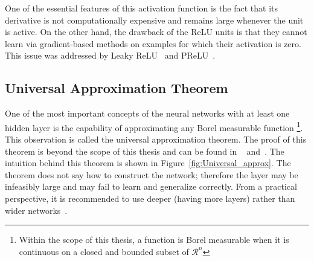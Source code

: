 One of the essential features of this activation function is the fact that its derivative is not computationally expensive and remains large whenever the unit is active. On the other hand, the drawback of the ReLU units is that they cannot learn via gradient-based methods on examples for which their activation is zero.
This issue was addressed by Leaky ReLU~\cite{LeakyReLU} and PReLU~\cite{PReLU}. 

\subsection{Universal Approximation Theorem}

One of the most important concepts of the neural networks with at least one hidden layer is the capability of approximating any Borel measurable function \footnote{Within the scope of this thesis, a function is Borel measurable when it is continuous on a closed and bounded subset of $\mathcal{R}^{n}$}. This observation is called the universal approximation theorem. The proof of this theorem is beyond the scope of this thesis and can be found in ~\cite{Universal_approx_1} and~\cite{Universal_approx_2}. The intuition behind this theorem is shown in Figure~\ref{fig:Universal_approx}.
The theorem does not say how to construct the network; therefore the layer may be infeasibly large and may fail to learn and generalize correctly. From a practical perspective, it is recommended to use deeper (having more layers) rather than wider networks~\cite{Relu_regions}. 

